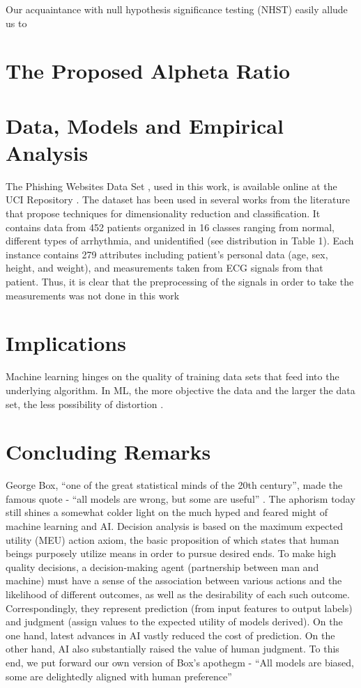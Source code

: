 \documentclass[deca,blindrev]{informs3}
\begin{document}
Our acquaintance with null hypothesis  significance  testing (NHST) easily allude us to 

\section {The Proposed Alpheta Ratio}

\section{Data, Models  and Empirical Analysis}

The Phishing Websites Data Set \citep{Mohammad2015} , used in this work, is available online at the UCI Repository \citep{Lichman:2013}. The dataset has been
used in several works from the literature that propose techniques for dimensionality reduction and classification. It
contains data from 452 patients organized in 16 classes ranging from normal, different types of arrhythmia, and unidentified (see distribution in Table 1). Each instance contains
279 attributes including patient’s personal data (age, sex,
height, and weight), and measurements taken from ECG
signals from that patient. Thus, it is clear that the preprocessing of the signals in order to take the measurements was
not done in this work

\section{Implications}

Machine learning hinges  on the quality of training data sets that feed into the underlying algorithm.  In ML,  the more objective the data and the larger the data set, the less possibility of distortion \citep{Rosso2015}.

\section {Concluding Remarks}

George Box, ``one of the great statistical minds of the 20th century'',  made the famous quote - ``all models are wrong, but some are useful'' \citep[p. 424]{box1987empirical}.  The aphorism today still shines a somewhat colder light on the much hyped and feared might of machine learning and AI. Decision analysis is  based on the maximum expected utility (MEU) action axiom, the basic proposition of which states that  human beings purposely utilize means in order to pursue  desired ends. To make high quality decisions, a decision-making agent (partnership between man and machine)  must have a sense of the association between various actions and the likelihood of different outcomes, as well as the desirability of each such outcome. Correspondingly, they represent prediction (from input features to output labels) and judgment (assign values to the expected utility of models derived). On the one hand,  latest advances in AI vastly  reduced the cost of prediction. On the other hand, AI also substantially raised the value of human judgment. To this end, we put forward our own version of Box's apothegm -    ``All models are biased, some are delightedly  aligned with human preference''
\end{document}
